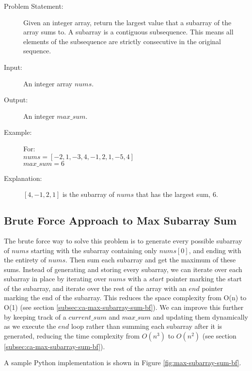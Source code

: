 \begin{description}
    \item[Problem Statement:]
        Given an integer array, return the largest value that a subarray of the array sums to. A subarray is a contiguous subsequence. This means all elements of the subsequence are strictly consecutive in the original sequence.

    \item[Input:]
        An integer array $nums$.
        
    \item[Output:]
        An integer $max\_sum$. 
        
    \item[Example:] For:\\
        $nums =  [-2,1,-3,4,-1,2,1,-5,4]$\\
        $max\_sum = 6$
        
    \item[Explanation:]
        $[4,-1,2,1]$ is the subarray of $nums$ that has the largest sum, 6.
        
\end{description}


\subsection{Brute Force Approach to Max Subarray Sum}
The brute force way to solve this problem is to generate every possible subarray of $nums$
starting with the subarray containing only $nums[0]$, and ending with the entirety of $nums$.
Then sum each subarray and get the maximum of these sums.
Instead of generating and storing every subarray, we can iterate over each subarray in place by iterating over $nums$ with a $start$ pointer marking the start of the subarray,
and iterate over the rest of the array with an $end$ pointer marking the end of the subarray. This reduces the space complexity from O(n) to O(1) (see section \ref{subsec:ca-max-subarray-sum-bf}).
We can improve this further by keeping track of a $current\_sum$ and $max\_sum$ and updating them dynamically as we execute the $end$ loop rather than summing each subarray after it is generated,
reducing the time complexity from $O(n^3)$ to $O(n^2)$ (see section \ref{subsec:ca-max-subarray-sum-bf}).

A sample Python implementation is shown in Figure \ref{fig:max-subarray-sum-bf}.

